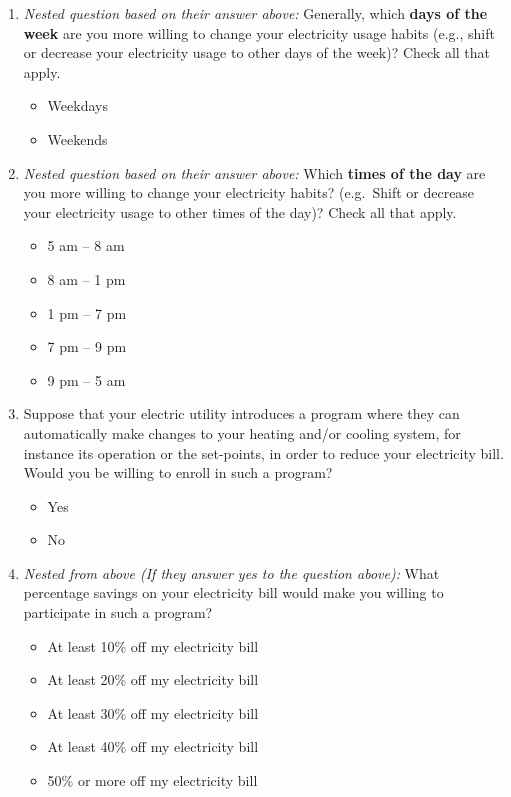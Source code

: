 \documentclass{article}
\begin{document}
\begin{enumerate}
\item \textit{Nested question based on their answer above:}
Generally, which \textbf{days of the week} are you more willing to change your electricity usage habits (e.g., shift or decrease your electricity usage to other days of the week)? Check all that apply.
\begin{itemize}
  \item[\checkbox] Weekdays
  \item[\checkbox] Weekends
\end{itemize}
 

\item \textit{Nested question based on their answer above:}
Which \textbf{times of the day} are you more willing to change your electricity habits? (e.g.\ Shift or decrease your electricity usage to other times of the day)? Check all that apply.
\begin{itemize}
  \item[\checkbox] 5 am -- 8 am
  \item[\checkbox] 8 am -- 1 pm
  \item[\checkbox] 1 pm -- 7 pm
  \item[\checkbox] 7 pm -- 9 pm
  \item[\checkbox] 9 pm -- 5 am
\end{itemize}
 

\item Suppose that your electric utility introduces a program where they can automatically make changes to your heating and/or cooling system, for instance its operation or the set-points, in order to reduce your electricity bill. Would you be willing to enroll in such a program?
\begin{itemize}
  \item[\checkbox] Yes
  \item[\checkbox] No
\end{itemize}
 

\item \textit{Nested from above (If they answer yes to the question above):}
What percentage savings on your electricity bill would make you willing to participate in such a program?
\begin{itemize}
  \item[\checkbox] At least 10\% off my electricity bill
  \item[\checkbox] At least 20\% off my electricity bill
  \item[\checkbox] At least 30\% off my electricity bill
  \item[\checkbox] At least 40\% off my electricity bill
  \item[\checkbox] 50\% or more off my electricity bill
\end{itemize}
 


\end{enumerate}
\end{document}
